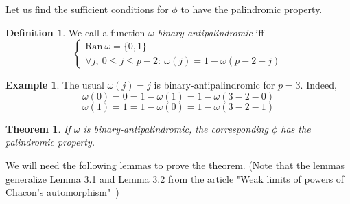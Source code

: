 \documentclass[a4paper]{article}
\theoremstyle{plain}
\newtheorem{theorem}{Theorem}[section]
\theoremstyle{definition}
\newtheorem{definition}{Definition}
\newtheorem*{example}{Example}
\begin{document}
    Let us find the sufficient conditions for $\phi$ to have the palindromic property.
    
\begin{definition}
We call a function $\omega$  \textit{binary-antipalindromic} iff
\[\begin{cases}
	\mathrm{Ran }\ \omega = \{0,1\} \\
	\forall j,\ 0 \le j \le p-2: \  \omega(j) = 1 - \omega(p-2-j)
\end{cases}\]
\end{definition}


\begin{example}
The usual $\omega(j)=j$ is binary-antipalindromic for $p = 3$. Indeed,
$$
\omega(0) = 0 = 1 - \omega(1) = 1 - \omega(3 - 2 - 0)
$$
$$
\omega(1) = 1 = 1 - \omega(0) = 1 - \omega(3 - 2 - 1)
$$
\end{example}

\begin{theorem}
If $\omega$ is binary-antipalindromic, the corresponding $\phi$ has the palindromic property.
\end{theorem}

We will need the following lemmas to prove the theorem. (Note that the lemmas generalize Lemma 3.1 and Lemma 3.2 from the article "Weak limits of powers of Chacon's automorphism"\ )
\end{document}
